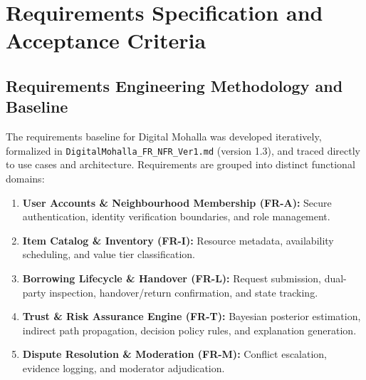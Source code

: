 \chapter{Requirements Specification and Acceptance Criteria}

\section{Requirements Engineering Methodology and Baseline}
The requirements baseline for Digital Mohalla was developed iteratively, formalized in \texttt{DigitalMohalla\_FR\_NFR\_Ver1.md} (version 1.3), and traced directly to use cases and architecture. Requirements are grouped into distinct functional domains:
\begin{enumerate}
    \item \textbf{User Accounts \& Neighbourhood Membership (FR-A):} Secure authentication, identity verification boundaries, and role management.
    \item \textbf{Item Catalog \& Inventory (FR-I):} Resource metadata, availability scheduling, and value tier classification.
    \item \textbf{Borrowing Lifecycle \& Handover (FR-L):} Request submission, dual-party inspection, handover/return confirmation, and state tracking.
    \item \textbf{Trust \& Risk Assurance Engine (FR-T):} Bayesian posterior estimation, indirect path propagation, decision policy rules, and explanation generation.
    \item \textbf{Dispute Resolution \& Moderation (FR-M):} Conflict escalation, evidence logging, and moderator adjudication.
\end{enumerate}

